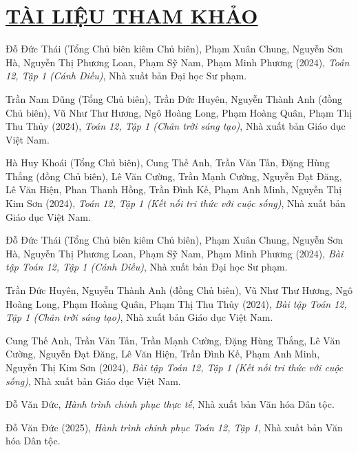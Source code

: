 \documentclass[12pt,a4paper,oneside]{book}
\theoremstyle{theorem}
\theoremstyle{definition}
\begin{document}

    \chapter*{\underline{TÀI LIỆU THAM KHẢO}}
    \noindent [1] Đỗ Đức Thái (Tổng Chủ biên kiêm Chủ biên), Phạm Xuân Chung, Nguyễn Sơn Hà, Nguyễn Thị Phương Loan, Phạm Sỹ Nam, Phạm Minh Phương (2024), \textit{Toán 12, Tập 1 (Cánh Diều)}, Nhà xuất bản Đại học Sư phạm.

    \noindent [2] Trần Nam Dũng (Tổng Chủ biên), Trần Đức Huyên, Nguyễn Thành Anh (đồng Chủ biên), Vũ Như Thư Hương, Ngô Hoàng Long, Phạm Hoàng Quân, Phạm Thị Thu Thủy (2024), \textit{Toán 12, Tập 1 (Chân trời sáng tạo)}, Nhà xuất bản Giáo dục Việt Nam.
    
    \noindent [3] Hà Huy Khoái (Tổng Chủ biên), Cung Thế Anh, Trần Văn Tấn, Đặng Hùng Thắng (đồng Chủ biên), Lê Văn Cường, Trần Mạnh Cường, Nguyễn Đạt Đăng, Lê Văn Hiện, Phan Thanh Hồng, Trần Đình Kế, Phạm Anh Minh, Nguyễn Thị Kim Sơn (2024), \textit{Toán 12, Tập 1 (Kết nối tri thức với cuộc sống)}, Nhà xuất bản Giáo dục Việt Nam.
    
    \noindent [4] Đỗ Đức Thái (Tổng Chủ biên kiêm Chủ biên), Phạm Xuân Chung, Nguyễn Sơn Hà, Nguyễn Thị Phương Loan, Phạm Sỹ Nam, Phạm Minh Phương (2024), \textit{Bài tập Toán 12, Tập 1 (Cánh Diều)}, Nhà xuất bản Đại học Sư phạm.
    
    \noindent [5] Trần Đức Huyên, Nguyễn Thành Anh (đồng Chủ biên), Vũ Như Thư Hương, Ngô Hoàng Long, Phạm Hoàng Quân, Phạm Thị Thu Thủy (2024), \textit{Bài tập Toán 12, Tập 1 (Chân trời sáng tạo)}, Nhà xuất bản Giáo dục Việt Nam.
    
    \noindent [6] Cung Thế Anh, Trần Văn Tấn, Trần Mạnh Cường, Đặng Hùng Thắng, Lê Văn Cường, Nguyễn Đạt Đăng, Lê Văn Hiện, Trần Đình Kế, Phạm Anh Minh, Nguyễn Thị Kim Sơn (2024), \textit{Bài tập Toán 12, Tập 1 (Kết nối tri thức với cuộc sống)}, Nhà xuất bản Giáo dục Việt Nam.
    
    \noindent [7] Đỗ Văn Đức, \textit{Hành trình chinh phục thực tế}, Nhà xuất bản Văn hóa Dân tộc.

    \noindent [8] Đỗ Văn Đức (2025), \textit{Hành trình chinh phục Toán 12, Tập 1}, Nhà xuất bản Văn hóa Dân tộc.

        
\end{document}

